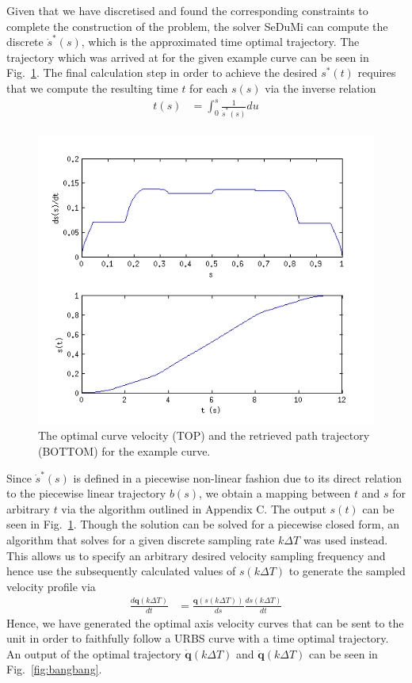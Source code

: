 Given that we have discretised and found the corresponding constraints to complete the construction of the problem, the solver SeDuMi can compute the discrete $\dot{s}^*(s)$, which is the approximated time optimal trajectory. The trajectory which was arrived at for the given example curve can be seen in Fig.~\ref{fig:sdot_st}.
The final calculation step in order to achieve the desired $s^*(t)$ requires that we compute the resulting time $t$ for each $s(s)$ via the inverse relation
\begin{align*}
t(s) &= \int_0^s\frac{1}{\dot{s}^*(s)}du\\ 
\end{align*}

\begin{figure}[htbp]
\includegraphics[width=\textwidth]{figures/optimisation/sdot_st.png}
\caption[$\dot{s}^*(s)$ and $s^*(t)$]{
The optimal curve velocity (TOP) and the retrieved path trajectory (BOTTOM) for the example curve.
\label{fig:sdot_st}}
\end{figure}

Since $\dot{s}^*(s)$ is defined in a piecewise non-linear fashion due to its direct relation to the piecewise linear trajectory $b(s)$, we obtain a mapping between $t$ and $s$ for arbitrary $t$ via the algorithm outlined in Appendix C. The output $s(t)$ can be seen in Fig.~\ref{fig:sdot_st}. Though the solution can be solved for a piecewise closed form, an algorithm that solves for a given discrete sampling rate $k\Delta T$ was used instead. This allows us to specify an arbitrary desired velocity sampling frequency and hence use the subsequently calculated values of $s(k\Delta T)$ to generate the sampled velocity profile via 
\begin{align*}
\frac{d\textbf{q}\left(k \Delta T\right)}{dt} &= \frac{\textbf{q}\left(s(k\Delta T)\right)}{ds}\frac{ds(k\Delta T)}{dt}
\end{align*}
Hence, we have generated the optimal axis velocity curves that can be sent to the unit in order to faithfully follow a URBS curve with a time optimal trajectory.
An output of the optimal trajectory $\dot{\textbf{q}}(k\Delta T)$ and $\ddot{\textbf{q}}(k\Delta T)$ can be seen in Fig.~\ref{fig:bangbang}.

